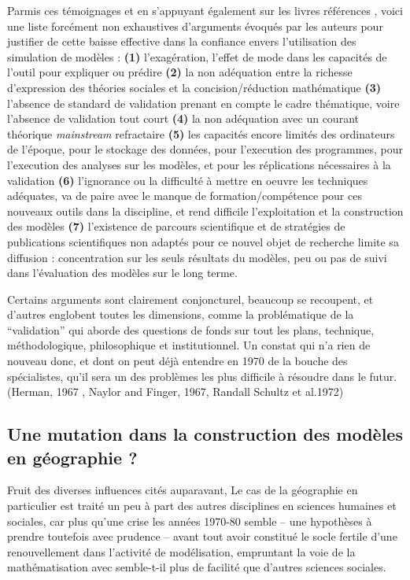 Parmis ces témoignages et en s'appuyant également sur les livres références \autocite{Naylor1966,Guetzkow1972,Dutton1971}, voici une liste forcément non exhaustives d'arguments évoqués par les auteurs pour justifier de cette baisse effective dans la confiance envers l'utilisation des simulation de modèles : \textbf{(1)} l'exagération, l'effet de mode dans les capacités de l'outil pour expliquer ou prédire \textbf{(2)} la non adéquation entre la richesse d'expression des théories sociales et la concision/réduction mathématique \textbf{(3)} l'absence de standard de validation prenant en compte le cadre thématique, voire l'absence de validation tout court \textbf{(4)} la non adéquation avec un courant théorique \textit{mainstream} refractaire \textbf{(5)} les capacités encore limités des ordinateurs de l'époque, pour le stockage des données, pour l'execution des programmes, pour l'execution des analyses sur les modèles, et pour les réplications nécessaires à la validation \textbf{(6)} l'ignorance ou la difficulté à mettre en oeuvre les techniques adéquates, va de paire avec le manque de formation/compétence pour ces nouveaux outils dans la discipline, et rend difficile l'exploitation et la construction des modèles \textbf{(7)} l'existence de parcours scientifique et de stratégies de publications scientifiques non adaptés pour ce nouvel objet de recherche limite sa diffusion : concentration sur les seuls résultats du modèles, peu ou pas de suivi dans l'évaluation des modèles sur le long terme.

Certains arguments sont clairement conjoncturel, beaucoup se recoupent, et d'autres englobent toutes les dimensions, comme la problématique de la \enquote{validation} qui aborde des questions de fonds sur tout les plans, technique, méthodologique, philosophique et institutionnel. Un constat qui n'a rien de nouveau donc, et dont on peut déjà entendre en 1970 de la bouche des spécialistes, qu'il sera un des problèmes les plus difficile à résoudre dans le futur. (Herman, 1967 , Naylor and Finger, 1967, Randall Schultz et al.1972)  


\subsection{Une mutation dans la construction des modèles en géographie ?}
\label{ssec:crise_mutation}

Fruit des diverses influences cités auparavant, Le cas de la géographie en particulier est traité un peu à part des autres disciplines en sciences humaines et sociales, car plus qu'une crise les années 1970-80 semble -- une hypothèses à prendre toutefois avec prudence -- avant tout avoir constitué le socle fertile d'une renouvellement dans l'activité de modélisation, empruntant la voie de la mathématisation avec semble-t-il plus de facilité que d'autres sciences sociales.

